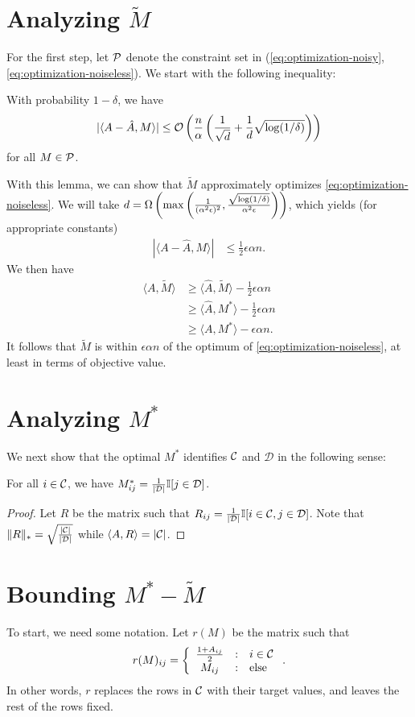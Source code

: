 \documentclass[11pt]{article}
\newcommand{\M}{\tilde{M}}
\newcommand{\A}{\hat{A}}
\newcommand{\sD}{\mathcal{D}}
\newcommand{\oo}{\mathcal{O}}
\begin{document}
\section{Analyzing $\M$}
For the first step, let $\mathcal{P}$ denote the constraint set in (\ref{eq:optimization-noisy},\ref{eq:optimization-noiseless}). 
We start with the following inequality:
\begin{lemma}
\label{lem:concentration}
With probability $1-\delta$, we have
\[ |\langle A-\A, M \rangle| \leq \oo\p{\frac{n}{\alpha}\p{\frac{1}{\sqrt{d}} + \frac{1}{d}\sqrt{\log(1/\delta)}}} \]
for all $M \in \mathcal{P}$.
\end{lemma}
With this lemma, we can show that $\M$ approximately optimizes \eqref{eq:optimization-noiseless}. 
We will take $d = \Omega\left(\max\left(\frac{1}{(\alpha^2\epsilon)^2}, \frac{\sqrt{\log(1/\delta)}}{\alpha^2\epsilon}\right)\right)$, which yields (for appropriate constants)
\begin{align}
|\langle A-\A, M \rangle| &\leq \frac{1}{2}\epsilon \alpha n.
\end{align}
We then have
\begin{align}
\langle A, \M \rangle  &\geq \langle \A, \M \rangle - \frac{1}{2}\epsilon \alpha n \\
 &\geq \langle \A, M^* \rangle - \frac{1}{2} \epsilon \alpha n \\
 &\geq \langle A, M^* \rangle - \epsilon \alpha n.
\end{align}
It follows that $\M$ is within $\epsilon \alpha n$ of the optimum of \eqref{eq:optimization-noiseless}, 
at least in terms of objective value.

\section{Analyzing $M^*$}
We next show that the optimal $M^*$ identifies $\mathcal{C}$ and $\sD$ in the following sense:
\begin{proposition}
For all $i \in \mathcal{C}$, we have $M^*_{ij} = \frac{1}{|\sD|}\bI[j \in \sD]$.
\end{proposition}
\begin{proof}
Let $R$ be the matrix such that $R_{ij} = \frac{1}{|\sD|}\bI[i \in \sC, j \in \sD]$. Note 
that $\|R\|_* = \sqrt{\frac{|\sC|}{|\sD|}}$ while $\langle A, R \rangle = |\mathcal{C}|$. 
\end{proof}

\section{Bounding $M^* - \M$}
To start, we need some notation. Let $r(M)$ be the matrix such that
\[ r(M)_{ij} = \left\{ \begin{array}{ccl} \frac{1+A_{ij}}{2} & : & i \in \mathcal{C} \\ M_{ij} & : & \text{else} \end{array} \right.. \]
In other words, $r$ replaces the rows in $\mathcal{C}$ with their target values, and 
leaves the rest of the rows fixed.
\end{document}
